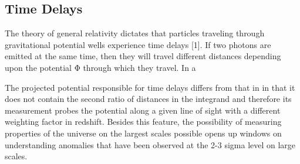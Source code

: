 \subsection{Time Delays}

The theory of general relativity dictates that particles
traveling through gravitational potential wells experience
time delays [1]. If two photons are emitted at the same
time, then they will travel different distances depending
upon the potential Φ through which they travel. In a




The projected potential
responsible for time delays differs from that in  in that it
does not contain the second ratio of distances in the integrand and
therefore its measurement probes the potential along a given line of
sight with a different weighting factor in redshift. Besides this
feature, the possibility of measuring properties of the universe on
the largest scales possible opens up windows on understanding
anomalies that have been observed at the 2-3 sigma level on large
scales.
